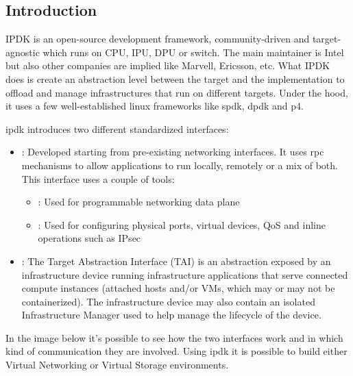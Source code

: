 \documentclass[../sn.tex]{subfiles}
\begin{document}
\subsection{Introduction}
IPDK is an open-source development framework, community-driven and target-agnostic which runs on CPU, IPU, DPU or switch.
The main maintainer is Intel but also other companies are implied like Marvell, Ericsson, etc.
What IPDK does is create an abstraction level between the target and the implementation to offload and manage infrastructures that run on different targets.
Under the hood, it uses a few well-established linux frameworks like \acrshort{spdk}, \acrshort{dpdk} and \acrshort{p4}.

\acrshort{ipdk} introduces two different standardized interfaces:
\begin{itemize}
    \item {}: Developed starting from pre-existing networking interfaces.
    It uses \acrshort{rpc} mechanisms to allow applications to run locally, remotely or a mix of both.
    This interface uses a couple of tools:
        \begin{itemize}
            \item {}: Used for programmable networking data plane
            \item {}: Used for configuring physical ports, virtual devices, QoS and inline operations such as IPsec
        \end{itemize}
    \item {}: The Target Abstraction Interface (TAI) is an abstraction exposed by an infrastructure device running infrastructure applications that serve connected compute instances (attached hosts and/or VMs, which may or may not be containerized).
    The infrastructure device may also contain an isolated Infrastructure Manager used to help manage the lifecycle of the device.
\end{itemize}
In the image below it's possible to see how the two interfaces work and in which kind of communication they are involved\cite{ipdk-introduction}.
Using \acrshort{ipdk} it is possible to build either Virtual Networking or Virtual Storage environments.
\end{document}
